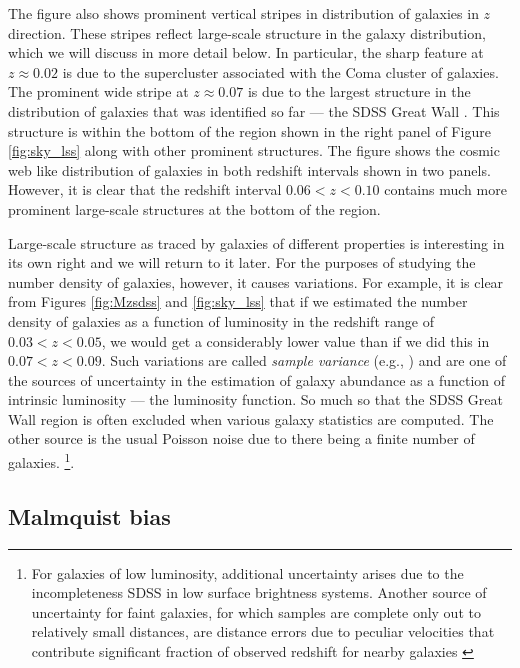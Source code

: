 The figure also shows prominent vertical stripes in distribution of galaxies in $z$ direction. These stripes reflect large-scale structure in the galaxy distribution, which we will discuss in more detail below. In particular, 
the sharp feature at $z\approx 0.02$ is due to the supercluster associated with the Coma cluster of galaxies. 
The prominent wide stripe at $z\approx 0.07$ is due to the largest structure in the distribution of galaxies that was identified so far --- the SDSS Great Wall \href{http://adsabs.harvard.edu/abs/2005ApJ...624..463G}{\citep{gott_etal05}}. This structure is within the bottom of the region shown in the right panel of Figure \ref{fig:sky_lss} along with other prominent structures.
The figure shows the cosmic web like distribution of galaxies in both redshift intervals shown in two panels. However, it is clear that the redshift interval $0.06<z<0.10$ contains much more prominent large-scale structures at the bottom of the region.

Large-scale structure as traced by galaxies of different properties is interesting in its own right and we will return to it later. For the purposes of studying the number density of galaxies, however, it causes variations. For example, it is clear from Figures \ref{fig:Mzsdss} and \ref{fig:sky_lss} that if we estimated the number density of galaxies as a function of luminosity in the redshift range of $0.03<z<0.05$, we would get a considerably lower value than if we did this in $0.07<z<0.09$. Such variations are called {\it sample variance} (e.g., \href{http://adsabs.harvard.edu/abs/2003ApJ...584..702H}{\citealt{hu_kravtsov03}}) and are one of the sources of uncertainty in the estimation of galaxy abundance as a function of intrinsic luminosity --- the luminosity function. So much so that the SDSS Great Wall region is often excluded when various galaxy statistics are computed. 
 The other source is the usual Poisson noise due to there being a finite number of galaxies. \footnote{For galaxies of low luminosity, additional uncertainty arises due to the incompleteness SDSS in low surface brightness systems. Another source of uncertainty for faint galaxies, for which samples are complete only out to relatively small distances, are distance errors due to peculiar velocities that contribute significant fraction of observed redshift for nearby galaxies \href{http://adsabs.harvard.edu/abs/2012MNRAS.421..621B}{\citep{baldry_etal12}}}. 

\subsection{Malmquist bias}

